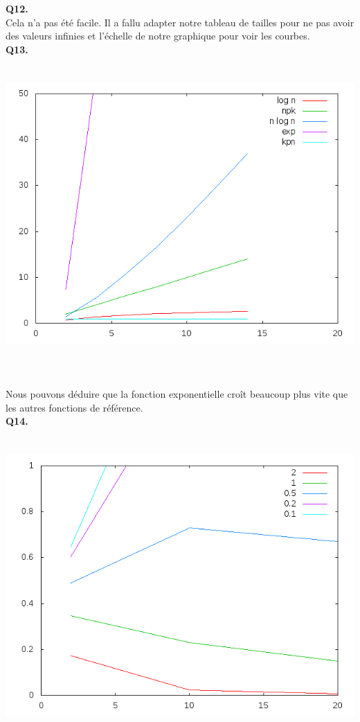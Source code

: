 \textbf{Q12.}
~\\
Cela n'a pas été facile. Il a fallu adapter notre tableau de tailles pour ne pas avoir des valeurs infinies et l'échelle de notre graphique pour voir les courbes.
~\\

\textbf{Q13.}
~\\
\includegraphics[height=12cm, width=\textwidth]{../lin_ref.png}
~\\
Nous pouvons déduire que la fonction exponentielle croît beaucoup plus vite que les autres fonctions de référence.
~\\

\textbf{Q14.}
~\\
\includegraphics[height=12cm, width=\textwidth]{../lin_lognepsi.png}
~\\

